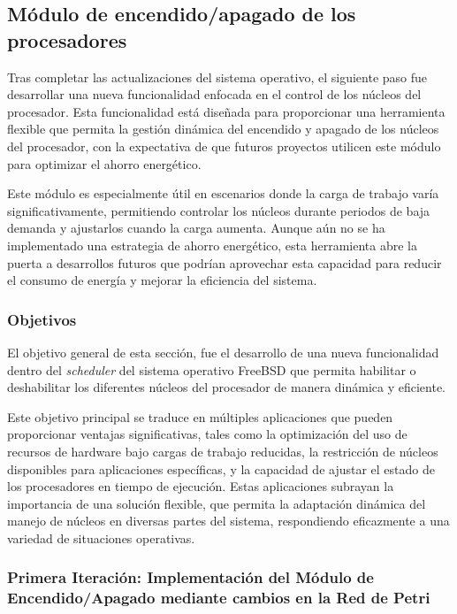 \subsection{Módulo de encendido/apagado de los procesadores}

Tras completar las actualizaciones del sistema operativo, el siguiente paso fue desarrollar una nueva funcionalidad enfocada en el control de los núcleos del procesador. Esta funcionalidad está diseñada para proporcionar una herramienta flexible que permita la gestión dinámica del encendido y apagado de los núcleos del procesador, con la expectativa de que futuros proyectos utilicen este módulo para optimizar el ahorro energético.

Este módulo es especialmente útil en escenarios donde la carga de trabajo varía significativamente, permitiendo controlar los núcleos durante periodos de baja demanda y ajustarlos cuando la carga aumenta. Aunque aún no se ha implementado una estrategia de ahorro energético, esta herramienta abre la puerta a desarrollos futuros que podrían aprovechar esta capacidad para reducir el consumo de energía y mejorar la eficiencia del sistema.

\subsubsection{Objetivos}

El objetivo general de esta sección, fue el desarrollo de una nueva funcionalidad dentro del \textit{scheduler} del sistema operativo FreeBSD que permita habilitar o deshabilitar los diferentes núcleos del procesador de manera dinámica y eficiente.

Este objetivo principal se traduce en múltiples aplicaciones que pueden proporcionar ventajas significativas, tales como la optimización del uso de recursos de hardware bajo cargas de trabajo reducidas, la restricción de núcleos disponibles para aplicaciones específicas, y la capacidad de ajustar el estado de los procesadores en tiempo de ejecución. Estas aplicaciones subrayan la importancia de una solución flexible, que permita la adaptación dinámica del manejo de núcleos en diversas partes del sistema, respondiendo eficazmente a una variedad de situaciones operativas.

\subsubsection{Primera Iteración: Implementación del Módulo de Encendido/Apagado mediante cambios en la Red de Petri}

